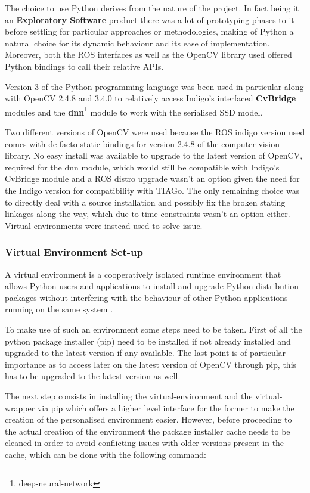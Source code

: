 The choice to use Python derives from the nature of the project. In fact being it an \textbf{Exploratory Software} product there was a lot of prototyping phases to it before settling for particular approaches or methodologies, making of Python a natural choice for its dynamic behaviour and its ease of implementation. Moreover, both the ROS interfaces as well as the OpenCV library used offered Python bindings to call their relative APIs.

Version 3 of the Python programming language was been used in particular along with OpenCV 2.4.8 and 3.4.0 to relatively access Indigo's interfaced \textbf{CvBridge} modules and the \textbf{dnn}\footnote{deep-neural-network} module to work with the serialised SSD model.

Two different versions of OpenCV were used because the ROS indigo version used comes with de-facto static bindings for version 2.4.8 of the computer vision library. No easy install was available to upgrade to the latest version of OpenCV, required for the dnn module, which would still be compatible with Indigo's CvBridge module and a ROS distro upgrade wasn't an option given the need for the Indigo version for compatibility with TIAGo. The only remaining choice was to directly deal with a source installation and possibly fix the broken stating linkages along the way, which due to time constraints wasn't an option either. Virtual environments were instead used to solve issue.

\subsubsection{Virtual Environment Set-up}

A virtual environment is a cooperatively isolated runtime environment that allows Python users and applications to install and upgrade Python distribution packages without interfering with the behaviour of other Python applications running on the same system \cite{website:virtualEnv}.

To make use of such an environment some steps need to be taken. First of all the python package installer (pip) need to be installed if not already installed and upgraded to the latest version if any available. The last point is of particular importance as to access later on the latest version of OpenCV through pip, this has to be upgraded to the latest version as well.

The next step consists in installing the virtual-environment and the virtual-wrapper via pip which offers a higher level interface for the former to make the creation of the personalised environment easier. However, before proceeding to the actual creation of the environment the package installer cache needs to be cleaned in order to avoid conflicting issues with older versions present in the cache, which can be done with the following command:

